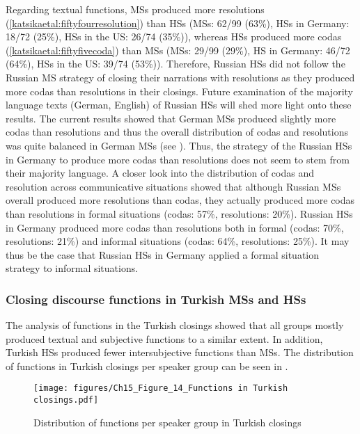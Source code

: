 \documentclass[output=paper,colorlinks,citecolor=brown]{langscibook}
\begin{document}
Regarding textual functions, MSs produced more resolutions (\ref{katsikaetal:fiftyfourresolution}) than HSs (MSs: 62/99 (63\%), HSs in Germany: 18/72 (25\%), HSs in the US: 26/74 (35\%)), whereas HSs produced more codas (\ref{katsikaetal:fiftyfivecoda}) than MSs (MSs: 29/99 (29\%), HS in Germany: 46/72 (64\%), HSs in the US: 39/74 (53\%)). Therefore, Russian HSs did not follow the Russian MS strategy of closing their narrations with resolutions as they produced more codas than resolutions in their closings. Future examination of the majority language texts (German, English) of Russian HSs will shed more light onto these results. The current results showed that German MSs produced slightly more codas than resolutions and thus the overall distribution of codas and resolutions was quite balanced in German MSs (see ). Thus, the strategy of the Russian HSs in Germany to produce more codas than resolutions does not seem to stem from their majority language. A closer look into the distribution of codas and resolution across communicative situations showed that although Russian MSs overall produced more resolutions than codas, they actually produced more codas than resolutions in formal situations (codas: 57\%, resolutions: 20\%). Russian HSs in Germany produced more codas than resolutions both in formal (codas: 70\%, resolutions: 21\%) and informal situations (codas: 64\%, resolutions: 25\%). It may thus be the case that Russian HSs in Germany applied a formal situation strategy to informal situations. 

\subsubsection{Closing discourse functions in Turkish MSs and HSs}
The analysis of functions in the Turkish closings showed that all groups mostly produced textual and subjective functions to a similar extent. In addition, Turkish HSs produced fewer intersubjective functions than MSs. The distribution of functions in Turkish closings per speaker group can be seen in . 

\begin{figure}
    \centering
    \texttt{[image: figures/Ch15\_Figure\_14\_Functions in Turkish closings.pdf]}
    \caption{Distribution of functions per speaker group in Turkish closings}
    \label{fig:katsikaetal:Turkishfunctionsclosings}
\end{figure}
\end{document}
